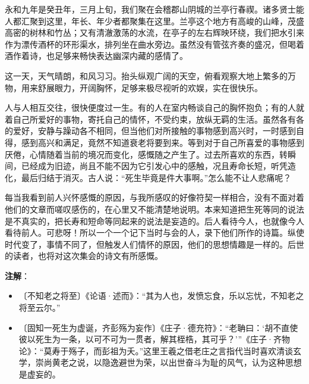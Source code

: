 \documentclass[12pt,UTF-8,openany,a4]{ctexbook}
\begin{document}
\begin{large}\yiwen
    
    永和九年是癸丑年，三月上旬，我们聚在会稽郡山阴城的兰亭行春禊。诸多贤士能人都汇聚到这里，年长、年少者都聚集在这里。兰亭这个地方有高峻的山峰，茂盛高密的树林和竹丛；又有清澈激荡的水流，在亭子的左右辉映环绕，我们把水引来作为漂传酒杯的环形渠水，排列坐在曲水旁边。虽然没有管弦齐奏的盛况，但喝着酒作着诗，也足够来畅快表达幽深内藏的感情了。
    
    这一天，天气晴朗，和风习习。抬头纵观广阔的天空，俯看观察大地上繁多的万物，用来舒展眼力，开阔胸怀，足够来极尽视听的欢娱，实在很快乐。
    
    人与人相互交往，很快便度过一生。有的人在室内畅谈自己的胸怀抱负；有的人就着自己所爱好的事物，寄托自己的情怀，不受约束，放纵无羁的生活。虽然各有各的爱好，安静与躁动各不相同，但当他们对所接触的事物感到高兴时，一时感到自得，感到高兴和满足，竟然不知道衰老将要到来。等到对于自己所喜爱的事物感到厌倦，心情随着当前的境况而变化，感慨随之产生了。过去所喜欢的东西，转瞬间，已经成为旧迹，尚且不能不因为它引发心中的感触，况且寿命长短，听凭造化，最后归结于消灭。古人说：“死生毕竟是件大事啊。”怎么能不让人悲痛呢？
    
    每当我看到前人兴怀感慨的原因，与我所感叹的好像符契一样相合，没有不面对着他们的文章而嗟叹感伤的，在心里又不能清楚地说明。本来知道把生死等同的说法是不真实的，把长寿和短命等同起来的说法是妄造的。后人看待今人，也就像今人看待前人。可悲呀！所以一个一个记下当时与会的人，录下他们所作的诗篇。纵使时代变了，事情不同了，但触发人们情怀的原因，他们的思想情趣是一样的。后世的读者，也将对这次集会的诗文有所感慨。
    

\end{large}


\newpage

\begin{Large}
   \noindent \textbf{注解}：
\end{Large}

\vspace{-1em}

\begin{itemize}
    \setlength\itemsep{-0.2em}
    \item〔不知老之将至〕{\yiwen 《论语·述而》：“其为人也，发愤忘食，乐以忘忧，不知老之将至云尔。”}
    \item〔固知一死生为虚诞，齐彭殇为妄作〕{\yiwen 《庄子·德充符》：“老聃曰：‘胡不直使彼以死生为一条，以可不可为一贯者，解其桎梏，其可乎？’”《庄子·齐物论》：“莫寿于殇子，而彭祖为夭。”这里王羲之借老庄之言指代当时喜欢清谈玄学，崇尚黄老之说，以隐逸避世为荣，以出世奋斗为耻的风气，认为这种思想是虚妄的。}
\end{itemize}
\end{document}
